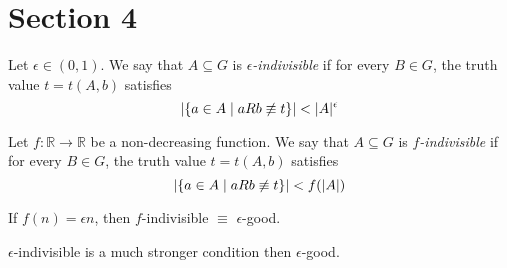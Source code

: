 \section{Section 4} \label{sec:section_4}


    \begin{definition}[Definition 4.2(a)] \label{def:epsilon_indivisible}
        Let $\epsilon \in (0,1)$.
        We say that $A \subseteq G$ is \emph{$\epsilon$-indivisible} if for every $B \in G$, the truth value $t = t(A,b)$ satisfies
        \[
            \left| \left\{ a\in A \mid a R b \not\equiv t \right\} \right| < |A|^{\epsilon}
        \]
    \end{definition}

    \begin{definition}[Definition 4.2(b)] \label{def:f_indivisible}
        Let $f: \mathbb{R} \longrightarrow \mathbb{R}$ be a non-decreasing function.
        We say that $A \subseteq G$ is \emph{$f$-indivisible} if for every $B \in G$, the truth value $t = t(A,b)$ satisfies
        \[
            \left| \left\{ a\in A \mid a R b \not\equiv t \right\} \right| < f(|A|)
        \]
    \end{definition}

    \begin{remark}
        If $f(n) = \epsilon n$, then $f$-indivisible $\equiv$ $\epsilon$-good.
    \end{remark}

    \begin{remark}
        $\epsilon$-indivisible is a much stronger condition then $\epsilon$-good.
    \end{remark}

